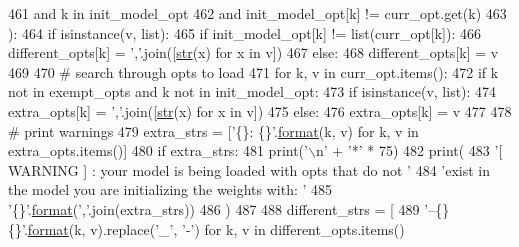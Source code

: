 \begin{DoxyCode}
461             \textcolor{keywordflow}{and} k \textcolor{keywordflow}{in} init\_model\_opt
462             \textcolor{keywordflow}{and} init\_model\_opt[k] != curr\_opt.get(k)
463         ):
464             \textcolor{keywordflow}{if} isinstance(v, list):
465                 \textcolor{keywordflow}{if} init\_model\_opt[k] != list(curr\_opt[k]):
466                     different\_opts[k] = \textcolor{stringliteral}{','}.join([\hyperlink{namespacegenerate__task__READMEs_a5b88452ffb87b78c8c85ececebafc09f}{str}(x) \textcolor{keywordflow}{for} x \textcolor{keywordflow}{in} v])
467             \textcolor{keywordflow}{else}:
468                 different\_opts[k] = v
469 
470     \textcolor{comment}{# search through opts to load}
471     \textcolor{keywordflow}{for} k, v \textcolor{keywordflow}{in} curr\_opt.items():
472         \textcolor{keywordflow}{if} k \textcolor{keywordflow}{not} \textcolor{keywordflow}{in} exempt\_opts \textcolor{keywordflow}{and} k \textcolor{keywordflow}{not} \textcolor{keywordflow}{in} init\_model\_opt:
473             \textcolor{keywordflow}{if} isinstance(v, list):
474                 extra\_opts[k] = \textcolor{stringliteral}{','}.join([\hyperlink{namespacegenerate__task__READMEs_a5b88452ffb87b78c8c85ececebafc09f}{str}(x) \textcolor{keywordflow}{for} x \textcolor{keywordflow}{in} v])
475             \textcolor{keywordflow}{else}:
476                 extra\_opts[k] = v
477 
478     \textcolor{comment}{# print warnings}
479     extra\_strs = [\textcolor{stringliteral}{'\{\}: \{\}'}.\hyperlink{namespaceparlai_1_1chat__service_1_1services_1_1messenger_1_1shared__utils_a32e2e2022b824fbaf80c747160b52a76}{format}(k, v) \textcolor{keywordflow}{for} k, v \textcolor{keywordflow}{in} extra\_opts.items()]
480     \textcolor{keywordflow}{if} extra\_strs:
481         print(\textcolor{stringliteral}{'\(\backslash\)n'} + \textcolor{stringliteral}{'*'} * 75)
482         print(
483             \textcolor{stringliteral}{'[ WARNING ] : your model is being loaded with opts that do not '}
484             \textcolor{stringliteral}{'exist in the model you are initializing the weights with: '}
485             \textcolor{stringliteral}{'\{\}'}.\hyperlink{namespaceparlai_1_1chat__service_1_1services_1_1messenger_1_1shared__utils_a32e2e2022b824fbaf80c747160b52a76}{format}(\textcolor{stringliteral}{','}.join(extra\_strs))
486         )
487 
488     different\_strs = [
489         \textcolor{stringliteral}{'--\{\} \{\}'}.\hyperlink{namespaceparlai_1_1chat__service_1_1services_1_1messenger_1_1shared__utils_a32e2e2022b824fbaf80c747160b52a76}{format}(k, v).replace(\textcolor{stringliteral}{'\_'}, \textcolor{stringliteral}{'-'}) \textcolor{keywordflow}{for} k, v \textcolor{keywordflow}{in} different\_opts.items()

\end{DoxyCode}
